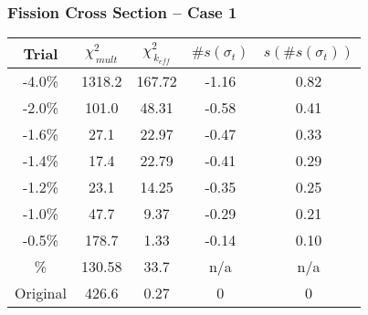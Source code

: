 \begin{frame}
\frametitle{Fission Cross Section -- Case 1}
\begin{table}[h!tb] 
\begin{center} \begin{tabular}{|ccccc|}
\hline {Trial} & {$\chi^2_{\,mult}$} & {$\chi^2_{\,{k}_{eff}}$} &
{$\#s(\sigma_t)$} & {$s(\#s(\sigma_t))$} \\ \hline -4.0\% & 1318.2 & 167.72 &
-1.16 & 0.82\\ -2.0\% & 101.0 & 48.31 & -0.58 & 0.41\\ -1.6\% & 27.1 & 22.97 &
-0.47 & 0.33\\ -1.4\% & 17.4 & 22.79 & -0.41 & 0.29\\ -1.2\% & 23.1 & 14.25 &
-0.35 & 0.25\\ -1.0\% & 47.7 & 9.37 & -0.29 & 0.21\\ -0.5\% & 178.7 & 1.33 &
-0.14 & 0.10\\ \nubar -1.14\% & 130.58 & 33.7 & n/a & n/a \\ Original & 426.6 &
0.27 & 0 & 0  \\  \hline \end{tabular} \end{center} \end{table}


\end{frame} 


